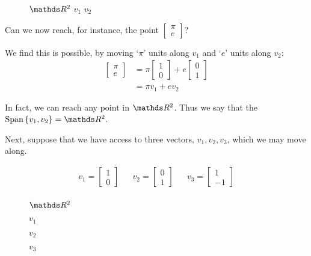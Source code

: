 \documentclass[11pt]{article}
\begin{document}
\begin{figure}
 {$\bbR^2$}
$v_1$
$v_2$
\end{figure}
Can we now reach, for instance, the point $\begin{bmatrix}\pi \\ e\end{bmatrix}$?

We find this is possible, by moving `$\pi$' units along $v_1$ and `$e$' units along $v_2$:
\begin{align*}
\begin{bmatrix}
\pi \\ e
\end{bmatrix}
&= \pi \begin{bmatrix}1 \\ 0\end{bmatrix}
+ e \begin{bmatrix}0 \\ 1\end{bmatrix}
\\
&= \pi v_1 + e v_2
\end{align*}

In fact, we can reach any point in $\bbR^2$. Thus we say that the $\text{Span} \left\{ v_1, v_2 \right\} = \bbR^2$.

Next, suppose that we have access to three vectors, $v_1,v_2,v_3$, which we may move along.

\begin{figure}[H]
\centering
\begin{align*}
v_1 = \begin{bmatrix}1\\0\end{bmatrix}
&&
v_2 = \begin{bmatrix}0\\1\end{bmatrix}
&&
v_3 = \begin{bmatrix}1\\-1\end{bmatrix}
\\
\end{align*}
\end{figure}

\begin{figure}

{$\bbR^2$}

{$v_1$}

{$v_2$}

$v_3$
\end{figure}
\end{document}
